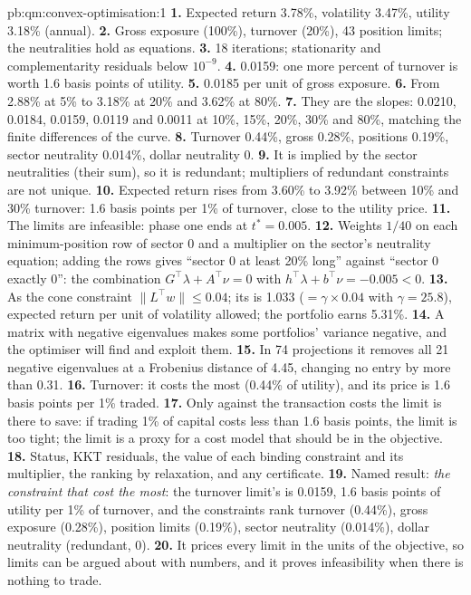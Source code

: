 \begin{solution}{pb:qm:convex-optimisation:1}
\textbf{1.} Expected return 3.78\%, volatility 3.47\%, utility 3.18\% (annual).
\textbf{2.} Gross exposure (100\%), turnover (20\%), 43 position limits; the neutralities hold as equations.
\textbf{3.} 18 iterations; stationarity and complementarity residuals below $10^{-9}$.
\textbf{4.} 0.0159: one more percent of turnover is worth 1.6 basis points of utility.
\textbf{5.} 0.0185 per unit of gross exposure.
\textbf{6.} From 2.88\% at 5\% to 3.18\% at 20\% and 3.62\% at 80\%.
\textbf{7.} They are the slopes: 0.0210, 0.0184, 0.0159, 0.0119 and 0.0011 at 10\%, 15\%, 20\%, 30\% and 80\%, matching the finite differences of the curve.
\textbf{8.} Turnover 0.44\%, gross 0.28\%, positions 0.19\%, sector neutrality 0.014\%, dollar neutrality 0.
\textbf{9.} It is implied by the sector neutralities (their sum), so it is redundant; multipliers of redundant constraints are not unique.
\textbf{10.} Expected return rises from 3.60\% to 3.92\% between 10\% and 30\% turnover: 1.6 basis points per 1\% of turnover, close to the utility price.
\textbf{11.} The limits are infeasible: phase one ends at $t^* = 0.005$.
\textbf{12.} Weights $1/40$ on each minimum-position row of sector 0 and a multiplier on the sector's neutrality equation; adding the rows gives ``sector 0 at least 20\% long'' against ``sector 0 exactly
0'': the combination $G^\top\lambda + A^\top\nu = 0$ with $h^\top\lambda + b^\top\nu = -0.005 < 0$.
\textbf{13.} As the cone constraint $\lVert L^\top w\rVert \le 0.04$; its  is 1.033 ($= \gamma \times 0.04$ with $\gamma = 25.8$), expected return per unit of volatility allowed; the portfolio earns 5.31\%.
\textbf{14.} A matrix with negative eigenvalues makes some portfolios' variance negative, and the optimiser will find and exploit them.
\textbf{15.} In 74 projections it removes all 21 negative eigenvalues at a Frobenius distance of 4.45, changing no entry by more than 0.31.
\textbf{16.} Turnover: it costs the most (0.44\% of utility), and its price is 1.6 basis points per 1\% traded.
\textbf{17.} Only against the transaction costs the limit is there to save: if trading 1\% of capital costs less than 1.6 basis points, the limit is too tight; the limit is a proxy for a cost model that should
be in the objective.
\textbf{18.} Status, KKT residuals, the value of each binding constraint and its multiplier, the ranking by relaxation, and any certificate.
\textbf{19.} Named result: \emph{the constraint that cost the most}: the turnover limit's  is 0.0159, 1.6 basis points of utility per 1\% of turnover, and the constraints rank turnover (0.44\%), gross
exposure (0.28\%), position limits (0.19\%), sector neutrality (0.014\%), dollar neutrality (redundant, 0).
\textbf{20.} It prices every limit in the units of the objective, so limits can be argued about with numbers, and it proves infeasibility when there is nothing to trade.
\end{solution}

